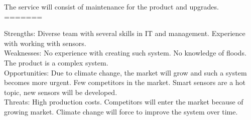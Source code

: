 The service will consist of maintenance for the product and upgrades.
=======

Strengths: Diverse team with several skills in IT and management. Experience with working with sensors.\\ 
Weaknesses: No experience with creating such system. No knowledge of floods. The product is a complex system.\\
Opportunities: Due to climate change, the market will grow and such a system becomes more urgent. Few competitors in the market. Smart sensors are a hot topic, new sensors will be developed.\\
Threats: High production costs. Competitors will enter the market because of growing market. Climate change will force to improve the system over time.\\

%
%
%


